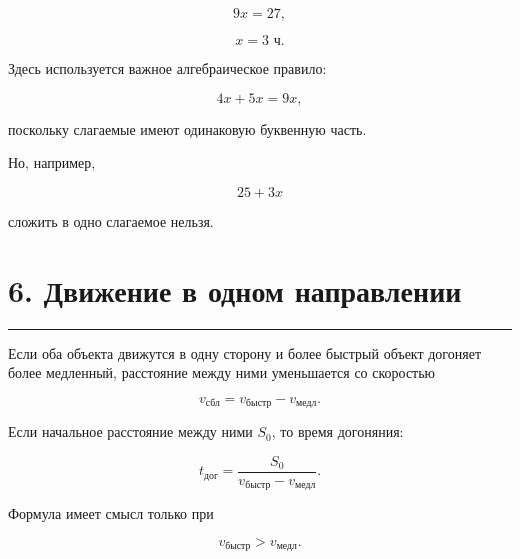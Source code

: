\documentclass[a4paper,12pt]{article}
\newcommand{\hour}{\text{ ч}}
\newcommand{\sectionline}{
    \vspace{-0.2em}
    {\color{linegray}\rule{\linewidth}{0.5pt}}
    \vspace{0.5em}
}
\begin{document}
\[
9x=27,
\]

\[
\boxed{x=3\hour}.
\]

Здесь используется важное алгебраическое правило:

\[
4x+5x=9x,
\]

поскольку слагаемые имеют одинаковую буквенную часть.

Но, например,

\[
25+3x
\]

сложить в одно слагаемое нельзя.


\section*{\textcolor{darkaccent}{6. Движение в одном направлении}}

\sectionline

Если оба объекта движутся в одну сторону и более быстрый объект
догоняет более медленный, расстояние между ними уменьшается со
скоростью

\[
\boxed{v_{\text{сбл}}=v_{\text{быстр}}-v_{\text{медл}}}.
\]

\begin{center}
\end{center}

Если начальное расстояние между ними \(S_0\), то время догоняния:

\[
\boxed{
t_{\text{дог}}=
\frac{S_0}{v_{\text{быстр}}-v_{\text{медл}}}
}.
\]

Формула имеет смысл только при

\[
v_{\text{быстр}}>v_{\text{медл}}.
\]

\end{document}
